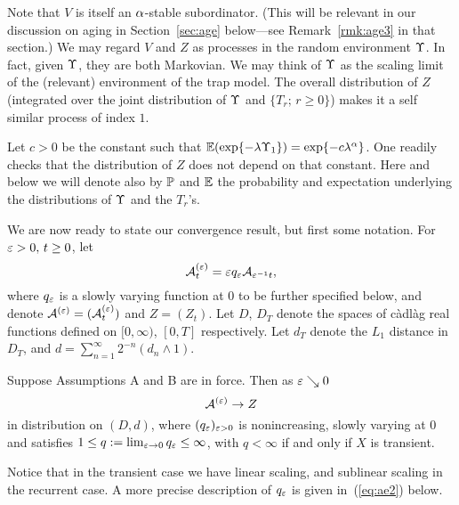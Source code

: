  
\begin{rmk}
\label{rmk:Z}
Note that $V$ is itself an $\a$-stable subordinator. (This will be relevant in our discussion on aging in Section~\ref{sec:age}
below---see Remark~\ref{rmk:age3} in that section.)
We may regard $V$ and $Z$ as processes in the random environment $\ups$. In fact, given $\ups$, they are both Markovian.
We may think of $\ups$ as the scaling limit of the (relevant) environment of the trap model. %
The overall distribution of $Z$ (integrated over the joint distribution of $\ups$ and $\{T_r;\,r\geq0\}$) makes it a self similar 
process of index $1$.
\end{rmk}
 

\begin{rmk}
 \label{rmk:const}
Let $c>0$ be the constant such that $\esp(\exp\{-\l \ups_1\})=\exp\{-c\l^\a\}$. One readily checks that the distribution
of $Z$ does not depend on that constant. %
Here and below we will denote also by $\P$ and $\esp$ the probability and expectation underlying the distributions of
$\ups$ and the $T_r$'s.
\end{rmk}

 

We are now ready to state our convergence 
result, but first some notation. For $\eps>0,\,t\geq0$, let 
\begin{equation}
\label{eq:ye}
\E^{(\eps)}_t=\eps q_\eps\E_{\eps^{-1}t}, 
\end{equation}
where $q_\eps$ is a slowly varying function at $0$ to be further specified below, %
and denote  $\E^{(\eps)}=(\E^{(\eps)}_t)$ and $Z=(Z_t)$. 
Let $D$, $D_T$ denote the spaces of c\`adl\`ag real functions defined on $[0,\infty)$, $[0,T]$ 
respectively. Let $d_T$ denote the $L_1$ distance in $D_T$, and $d=\sum_{n=1}^\infty2^{-n}(d_n\wedge1)$.


\begin{theo}
\label{teo:conv1}
Suppose Assumptions A and B are in force. 
Then as $\eps\searrow0$
\begin{equation}
\label{eq:conv1}
\E^{(\eps)}\to Z
\end{equation}
in distribution on $(D,d)$, where $(q_\eps)_{\eps>0}$ is nonincreasing, slowly varying at $0$ and satisfies
$1\leq q:=\lim_{\eps\to0}q_\eps\leq\infty$, with $q<\infty$ if and only if $X$ is transient.
\end{theo}
%

Notice that in the transient case we have linear scaling, and sublinear scaling in the recurrent case.
A more precise description of $q_\eps$ is given in~(\ref{eq:ae2}) below.

